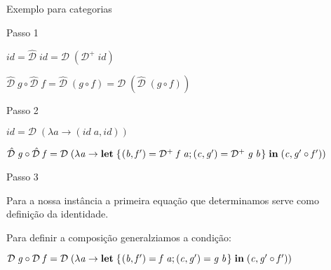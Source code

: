 \documentclass{beamer}
\theoremstyle{definition}
\theoremstyle{definition}
\theoremstyle{theorem}
\newcommand{\Varid}[1]{\mathit{#1}}
\begin{document}
\begin{frame}{Exemplo para categorias}
\begin{block}{Passo 1}

\ensuremath{\Varid{id}\mathrel{=}\mathcal{\hat{D}}\;\Varid{id}\mathrel{=}\mathcal{D}\;(\mathcal{D}^{+}\;\Varid{id})}

\ensuremath{\mathcal{\hat{D}}\;\Varid{g}\mathbin{\circ}\mathcal{\hat{D}}\;\Varid{f}\mathrel{=}\mathcal{\hat{D}}\;(\Varid{g}\mathbin{\circ}\Varid{f})\mathrel{=}\mathcal{D}\;(\mathcal{\hat{D}}\;(\Varid{g}\mathbin{\circ}\Varid{f}))}

\end{block}


\begin{block}{Passo 2}

\ensuremath{\Varid{id}\mathrel{=}\mathcal{D}\;(\lambda \Varid{a}\rightarrow (\Varid{id}\;\Varid{a},\Varid{id}))}

\ensuremath{\mathcal{\hat{D}}\;\Varid{g}\mathbin{\circ}\mathcal{\hat{D}}\;\Varid{f}\mathrel{=}\mathcal{D}\;(\lambda \Varid{a}\rightarrow \mathbf{let}\;\{\mskip1.5mu (\Varid{b},\Varid{f'})\mathrel{=}\mathcal{D}^{+}\;\Varid{f}\;\Varid{a};(\Varid{c},\Varid{g'})\mathrel{=}\mathcal{D}^{+}\;\Varid{g}\;\Varid{b}\mskip1.5mu\}\;\mathbf{in}\;(\Varid{c},\Varid{g'}\mathbin{\circ}\Varid{f'}))}

\end{block}

\begin{block}{Passo 3}

Para a nossa instância a primeira equação que determinamos serve como definição da identidade.

Para definir a composição generalziamos a condição:

\ensuremath{\mathcal{D}\;\Varid{g}\mathbin{\circ}\mathcal{D}\;\Varid{f}\mathrel{=}\mathcal{D}\;(\lambda \Varid{a}\rightarrow \mathbf{let}\;\{\mskip1.5mu (\Varid{b},\Varid{f'})\mathrel{=}\Varid{f}\;\Varid{a};(\Varid{c},\Varid{g'})\mathrel{=}\Varid{g}\;\Varid{b}\mskip1.5mu\}\;\mathbf{in}\;(\Varid{c},\Varid{g'}\mathbin{\circ}\Varid{f'}))}

\end{block}
\end{frame}
\end{document}
